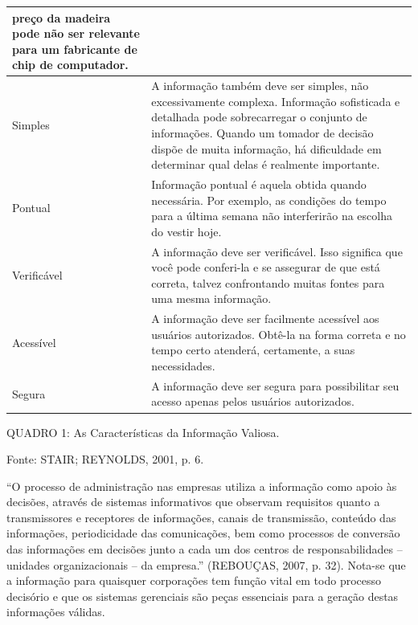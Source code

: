 \documentclass[a4paper]{article}
\begin{document}
\begin{flushleft}
\begin{supertabular}{|m{3.1599998cm}|m{12.458cm}|}
{pre\c{c}o da madeira pode n\~ao ser relevante para um fabricante de chip de computador.}\\\hline
{\sffamily Simples} &
{\sffamily A informa\c{c}\~ao tamb\'em deve ser simples, n\~ao excessivamente complexa.
Informa\c{c}\~ao sofisticada e detalhada pode sobrecarregar o conjunto de informa\c{c}\~oes. Quando um tomador de
decis\~ao disp\~oe de muita informa\c{c}\~ao, h\'a dificuldade em determinar qual delas \'e realmente
importante.}\\\hline
{\sffamily Pontual} &
{\sffamily Informa\c{c}\~ao pontual \'e aquela obtida quando necess\'aria. Por exemplo, as
condi\c{c}\~oes do tempo para a \'ultima semana n\~ao interferir\~ao na escolha do vestir hoje.}\\\hline
{\sffamily Verific\'avel} &
{ \textsf{A informa\c{c}\~ao deve ser verific\'avel. Isso significa que voc\^e pode conferi-la
e se assegurar de que est\'a correta, talvez confrontando muitas fontes para uma mesma informa\c{c}\~ao.}}\\\hline
{\sffamily Acess\'ivel} &
{\sffamily A informa\c{c}\~ao deve ser facilmente acess\'ivel aos usu\'arios autorizados.
Obt\^e-la na forma correta e no tempo certo atender\'a, certamente, a suas necessidades.}\\\hline
{\sffamily Segura} &
{\sffamily A informa\c{c}\~ao deve ser segura para possibilitar seu acesso apenas pelos
usu\'arios autorizados.}\\\hline
\end{supertabular}
\end{flushleft}
{
\textsf{QUADRO 1: As Caracter\'isticas da Informa\c{c}\~ao Valiosa. }}

{\sffamily
Fonte: STAIR; REYNOLDS, 2001, p. 6. }

{\sffamily
{}``O processo de administra\c{c}\~ao nas empresas utiliza a informa\c{c}\~ao como apoio \`as decis\~oes, atrav\'es de
sistemas informativos que observam requisitos quanto a transmissores e receptores de informa\c{c}\~oes, canais de
transmiss\~ao, conte\'udo das informa\c{c}\~oes, periodicidade das comunica\c{c}\~oes, bem como processos de
convers\~ao das informa\c{c}\~oes em decis\~oes junto a cada um dos centros de responsabilidades -- unidades
organizacionais -- da empresa.'' (REBOU\c{C}AS, 2007, p. 32). Nota-se que a informa\c{c}\~ao para quaisquer
corpora\c{c}\~oes tem fun\c{c}\~ao vital em todo processo decis\'orio e que os sistemas gerenciais s\~ao pe\c{c}as
essenciais para a gera\c{c}\~ao destas informa\c{c}\~oes v\'alidas. }
\end{document}
